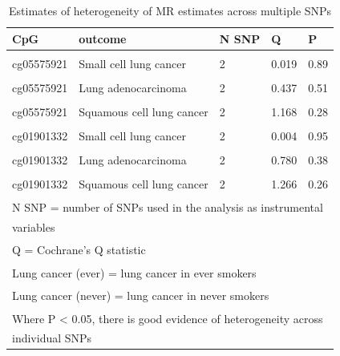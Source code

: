 \documentclass[11pt,oneside]{bristolthesis}
\begin{document}
\begin{table}[!h]
\caption{\label{tab:sup-tab6-07}Estimates of heterogeneity of MR estimates across multiple SNPs}
\centering
\begin{tabular}[t]{lllll}
\toprule
CpG & outcome & N SNP & Q & P\\
\midrule
\cellcolor{gray!6}{cg05575921} & \cellcolor{gray!6}{Lung cancer (ever)} & \cellcolor{gray!6}{2} & \cellcolor{gray!6}{1.838} & \cellcolor{gray!6}{0.17}\\
cg05575921 & Small cell lung cancer & 2 & 0.019 & 0.89\\
\cellcolor{gray!6}{cg05575921} & \cellcolor{gray!6}{Lung cancer (never)} & \cellcolor{gray!6}{2} & \cellcolor{gray!6}{1.424} & \cellcolor{gray!6}{0.23}\\
cg05575921 & Lung adenocarcinoma & 2 & 0.437 & 0.51\\
\cellcolor{gray!6}{cg05575921} & \cellcolor{gray!6}{Lung cancer} & \cellcolor{gray!6}{2} & \cellcolor{gray!6}{0.003} & \cellcolor{gray!6}{0.96}\\
\addlinespace
cg05575921 & Squamous cell lung cancer & 2 & 1.168 & 0.28\\
\cellcolor{gray!6}{cg01901332} & \cellcolor{gray!6}{Lung cancer (ever)} & \cellcolor{gray!6}{2} & \cellcolor{gray!6}{0.085} & \cellcolor{gray!6}{0.77}\\
cg01901332 & Small cell lung cancer & 2 & 0.004 & 0.95\\
\cellcolor{gray!6}{cg01901332} & \cellcolor{gray!6}{Lung cancer (never)} & \cellcolor{gray!6}{2} & \cellcolor{gray!6}{0.321} & \cellcolor{gray!6}{0.57}\\
cg01901332 & Lung adenocarcinoma & 2 & 0.780 & 0.38\\
\addlinespace
\cellcolor{gray!6}{cg01901332} & \cellcolor{gray!6}{Lung cancer} & \cellcolor{gray!6}{2} & \cellcolor{gray!6}{0.965} & \cellcolor{gray!6}{0.33}\\
cg01901332 & Squamous cell lung cancer & 2 & 1.266 & 0.26\\
\bottomrule
\multicolumn{5}{l}{\textsuperscript{} N SNP = number of SNPs used in the analysis as instrumental}\\
\multicolumn{5}{l}{variables}\\
\multicolumn{5}{l}{\textsuperscript{} Q = Cochrane’s Q statistic}\\
\multicolumn{5}{l}{\textsuperscript{} Lung cancer (ever) = lung cancer in ever smokers}\\
\multicolumn{5}{l}{\textsuperscript{} Lung cancer (never) = lung cancer in never smokers}\\
\multicolumn{5}{l}{\textsuperscript{} Where P < 0.05, there is good evidence of heterogeneity across}\\
\multicolumn{5}{l}{individual SNPs}\\
\end{tabular}
\end{table}
\pagebreak
\end{document}

